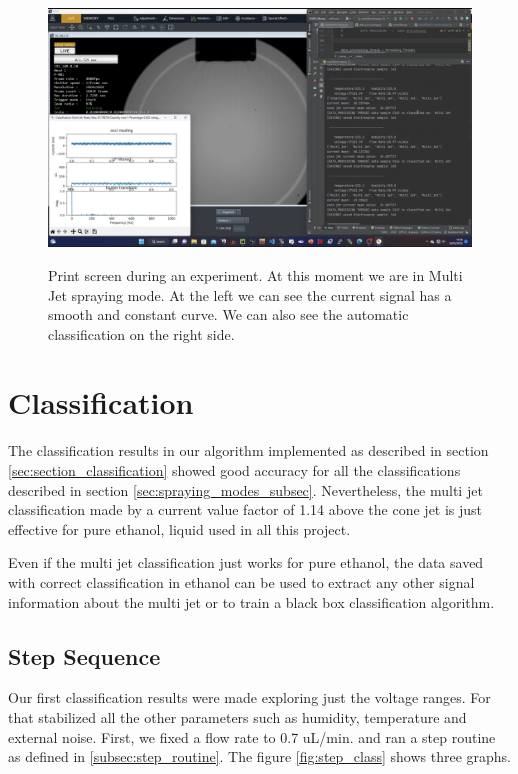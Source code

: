 \begin{figure}[H]
    \center
    {\includegraphics[width=16cm]{Figuras/19:03/axs2.png}}
    \caption{Print screen during an experiment. At this moment we are in Multi Jet spraying mode. At the left we can see the current signal has a smooth and constant curve. We can also see the automatic classification on the right side.}
    \label{fig:multi_class_exp}
\end{figure}


\section{Classification}
\label{sec:classification_results}

The classification results in our algorithm implemented as described in section \ref{sec:section_classification} showed good accuracy for all the classifications described in section \ref{sec:spraying_modes_subsec}.
Nevertheless, the multi jet classification made by a current value factor of 1.14 above the cone jet is just effective for pure ethanol, liquid used in all this project.

Even if the multi jet classification just works for pure ethanol, the data saved with correct classification in ethanol can be used to extract any other signal information about the multi jet or to train a black box classification algorithm.

\subsection{Step Sequence}
\label{subsec:step_results}

Our first classification results were made exploring just the voltage ranges. For that stabilized all the other parameters such as humidity, temperature and external noise.
First, we fixed a flow rate to 0.7 uL/min. and ran a step routine as defined in \ref{subsec:step_routine}. 
The figure \ref{fig:step_class} shows three graphs. 

